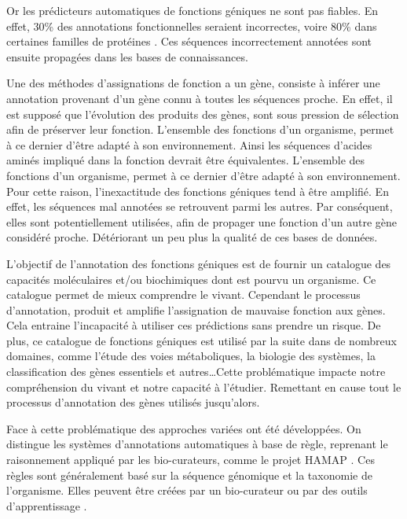 Or les prédicteurs automatiques de fonctions géniques ne sont pas fiables. En effet, 30\% des annotations fonctionnelles seraient incorrectes, voire 80\% dans certaines familles de protéines \parencites{devos2001intrinsic}{schnoes2009annotation}. Ces séquences incorrectement annotées sont ensuite propagées dans les bases de connaissances.

Une des méthodes d'assignations de fonction a un gène, consiste à inférer une annotation provenant d'un gène connu à toutes les séquences proche. En effet, il est supposé que l'évolution des produits des gènes, sont sous pression de sélection afin de préserver leur fonction. L'ensemble des fonctions d'un organisme, permet à ce dernier d'être adapté à son environnement. Ainsi les séquences d'acides aminés impliqué dans la fonction devrait être équivalentes. L'ensemble des fonctions d'un organisme, permet à ce dernier d'être adapté à son environnement. Pour cette raison, l'inexactitude des fonctions géniques tend à être amplifié. En effet, les séquences mal annotées se retrouvent parmi les autres. Par conséquent, elles sont potentiellement utilisées, afin de propager une fonction d'un autre gène considéré proche. Détériorant un peu plus la qualité de ces bases de données.

L'objectif de l'annotation des fonctions géniques est de fournir un catalogue des capacités moléculaires et/ou biochimiques dont est pourvu un organisme. Ce catalogue permet de mieux comprendre le vivant. Cependant le processus d'annotation, produit et amplifie l'assignation de mauvaise fonction aux gènes. Cela entraine l'incapacité à utiliser ces prédictions sans prendre un risque. De plus, ce catalogue de fonctions géniques est utilisé par la suite dans de nombreux domaines, comme l'étude des voies métaboliques, la biologie des systèmes, la classification des gènes essentiels et autres\ldots Cette problématique impacte notre compréhension du vivant et notre capacité à l'étudier. Remettant en cause tout le processus d'annotation des gènes utilisés jusqu'alors.

Face à cette problématique des approches variées ont été développées. On distingue les systèmes d'annotations automatiques à base de règle, reprenant le raisonnement appliqué par les bio-curateurs, comme le projet HAMAP \citep[voir][]{lima2009hamap}. Ces règles sont généralement basé sur la séquence génomique et la taxonomie de l'organisme. Elles peuvent être créées par un bio-curateur ou par des outils d'apprentissage \citep[voir][]{uniprot2011ongoing}.

